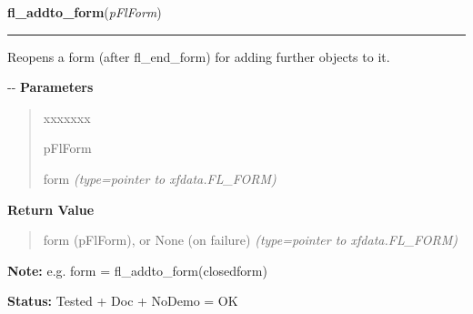     \label{xformslib:flbasic:fl_addto_form}

    \vspace{0.5ex}

\hspace{.8\funcindent}\begin{boxedminipage}{\funcwidth}

    \raggedright \textbf{fl\_addto\_form}(\textit{pFlForm})

    \vspace{-1.5ex}

    \rule{\textwidth}{0.5\fboxrule}
\setlength{\parskip}{2ex}

Reopens a form (after fl\_end\_form) for adding further objects to it.

-{}-
\setlength{\parskip}{1ex}
      \textbf{Parameters}
      \vspace{-1ex}

      \begin{quote}
        \begin{Ventry}{xxxxxxx}

          \item[pFlForm]


form
            {\it (type=pointer to xfdata.FL\_FORM)}

        \end{Ventry}

      \end{quote}

      \textbf{Return Value}
    \vspace{-1ex}

      \begin{quote}

form (pFlForm), or None (on failure)
      {\it (type=pointer to xfdata.FL\_FORM)}

      \end{quote}

\textbf{Note:} 
e.g. form = fl\_addto\_form(closedform)


\textbf{Status:} 
Tested + Doc + NoDemo = OK


    \end{boxedminipage}

    \label{xformslib:flbasic:fl_make_object}

